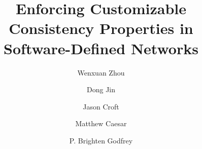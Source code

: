 \documentclass[letterpaper,twocolumn,10pt]{article}
\begin{document}



\title{\vspace{-0.24in}\Large \bf Enforcing Customizable Consistency Properties in\\Software-Defined Networks}

\author[*]{Wenxuan Zhou}
\author[**]{Dong Jin}
\author[*]{Jason Croft}
\author[*]{Matthew Caesar}
\author[*]{P. Brighten Godfrey}


\maketitle










%
%





%
%
%
%
%
%
%
%
%
%




%


\setlength{\itemsep}{-2mm}

\end{document}
